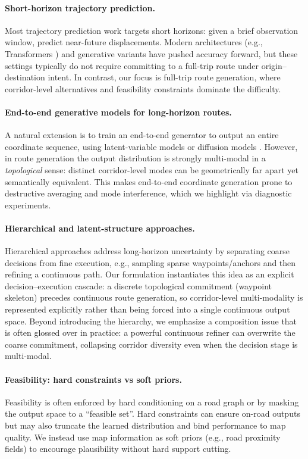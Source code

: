 \paragraph{Short-horizon trajectory prediction.}
Most trajectory prediction work targets short horizons: given a brief observation window, predict near-future displacements.
Modern architectures (e.g., Transformers \citep{vaswani2017attention}) and generative variants have pushed accuracy forward, but these settings typically do not require committing to a full-trip route under origin--destination intent.
In contrast, our focus is full-trip route generation, where corridor-level alternatives and feasibility constraints dominate the difficulty.

\paragraph{End-to-end generative models for long-horizon routes.}
A natural extension is to train an end-to-end generator to output an entire coordinate sequence, using latent-variable models \citep{kingma2014auto} or diffusion models \citep{ho2020ddpm}.
However, in route generation the output distribution is strongly multi-modal in a \emph{topological} sense: distinct corridor-level modes can be geometrically far apart yet semantically equivalent.
This makes end-to-end coordinate generation prone to destructive averaging and mode interference, which we highlight via diagnostic experiments.

\paragraph{Hierarchical and latent-structure approaches.}
Hierarchical approaches address long-horizon uncertainty by separating coarse decisions from fine execution, e.g., sampling sparse waypoints/anchors and then refining a continuous path.
Our formulation instantiates this idea as an explicit decision--execution cascade: a discrete topological commitment (waypoint skeleton) precedes continuous route generation, so corridor-level multi-modality is represented explicitly rather than being forced into a single continuous output space.
Beyond introducing the hierarchy, we emphasize a composition issue that is often glossed over in practice: a powerful continuous refiner can overwrite the coarse commitment, collapsing corridor diversity even when the decision stage is multi-modal.

\paragraph{Feasibility: hard constraints vs soft priors.}
Feasibility is often enforced by hard conditioning on a road graph or by masking the output space to a ``feasible set''.
Hard constraints can ensure on-road outputs but may also truncate the learned distribution and bind performance to map quality.
We instead use map information as soft priors (e.g., road proximity fields) to encourage plausibility without hard support cutting.

